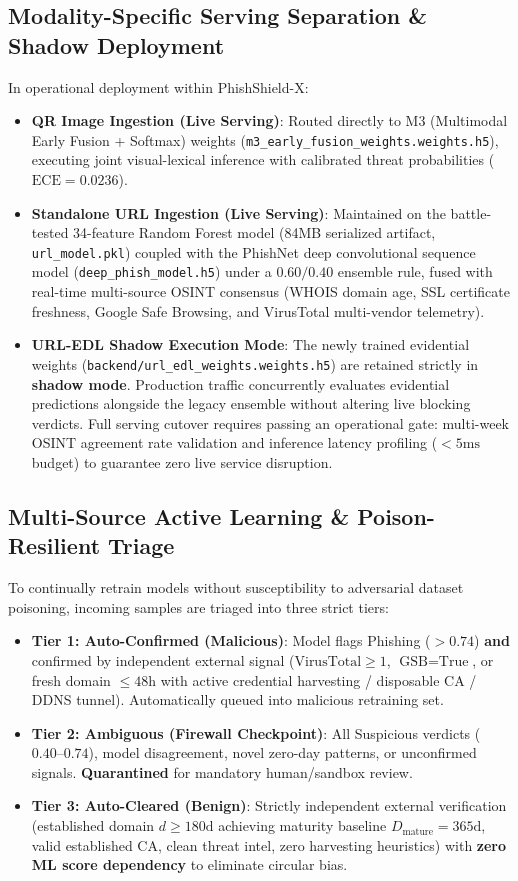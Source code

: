 \documentclass[conference]{IEEEtran}
\begin{document}
\subsection{Modality-Specific Serving Separation \& Shadow Deployment}
In operational deployment within PhishShield-X:
\begin{itemize}
    \item \textbf{QR Image Ingestion (Live Serving)}: Routed directly to M3 (Multimodal Early Fusion + Softmax) weights (\texttt{m3\_early\_fusion\_weights.weights.h5}), executing joint visual-lexical inference with calibrated threat probabilities ($\text{ECE} = 0.0236$).
    \item \textbf{Standalone URL Ingestion (Live Serving)}: Maintained on the battle-tested 34-feature Random Forest model (84MB serialized artifact, \texttt{url\_model.pkl}) coupled with the PhishNet deep convolutional sequence model (\texttt{deep\_phish\_model.h5}) under a $0.60 / 0.40$ ensemble rule, fused with real-time multi-source OSINT consensus (WHOIS domain age, SSL certificate freshness, Google Safe Browsing, and VirusTotal multi-vendor telemetry).
    \item \textbf{URL-EDL Shadow Execution Mode}: The newly trained evidential weights (\texttt{backend/url\_edl\_weights.weights.h5}) are retained strictly in \textbf{shadow mode}. Production traffic concurrently evaluates evidential predictions alongside the legacy ensemble without altering live blocking verdicts. Full serving cutover requires passing an operational gate: multi-week OSINT agreement rate validation and inference latency profiling ($<5\text{ms}$ budget) to guarantee zero live service disruption.
\end{itemize}

\subsection{Multi-Source Active Learning \& Poison-Resilient Triage}
To continually retrain models without susceptibility to adversarial dataset poisoning, incoming samples are triaged into three strict tiers:
\begin{itemize}
    \item \textbf{Tier 1: Auto-Confirmed (Malicious)}: Model flags Phishing ($>0.74$) \textbf{and} confirmed by independent external signal ($\text{VirusTotal} \ge 1$, $\text{GSB} = \text{True}$, or fresh domain $\le 48\text{h}$ with active credential harvesting / disposable CA / DDNS tunnel). Automatically queued into malicious retraining set.
    \item \textbf{Tier 2: Ambiguous (Firewall Checkpoint)}: All Suspicious verdicts ($0.40\text{--}0.74$), model disagreement, novel zero-day patterns, or unconfirmed signals. \textbf{Quarantined} for mandatory human/sandbox review.
    \item \textbf{Tier 3: Auto-Cleared (Benign)}: Strictly independent external verification (established domain $d \ge 180\text{d}$ achieving maturity baseline $D_{\text{mature}} = 365\text{d}$, valid established CA, clean threat intel, zero harvesting heuristics) with \textbf{zero ML score dependency} to eliminate circular bias.
\end{itemize}
\end{document}
